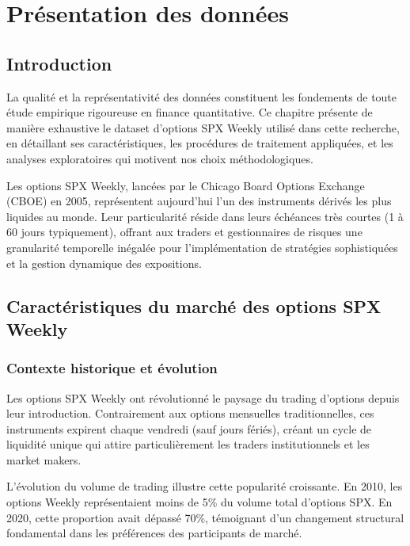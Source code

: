 \chapter{Présentation des données}

\section{Introduction}

La qualité et la représentativité des données constituent les fondements de toute étude empirique rigoureuse en finance quantitative. Ce chapitre présente de manière exhaustive le dataset d'options SPX Weekly utilisé dans cette recherche, en détaillant ses caractéristiques, les procédures de traitement appliquées, et les analyses exploratoires qui motivent nos choix méthodologiques.

Les options SPX Weekly, lancées par le Chicago Board Options Exchange (CBOE) en 2005, représentent aujourd'hui l'un des instruments dérivés les plus liquides au monde. Leur particularité réside dans leurs échéances très courtes (1 à 60 jours typiquement), offrant aux traders et gestionnaires de risques une granularité temporelle inégalée pour l'implémentation de stratégies sophistiquées et la gestion dynamique des expositions.

\section{Caractéristiques du marché des options SPX Weekly}

\subsection{Contexte historique et évolution}

Les options SPX Weekly ont révolutionné le paysage du trading d'options depuis leur introduction. Contrairement aux options mensuelles traditionnelles, ces instruments expirent chaque vendredi (sauf jours fériés), créant un cycle de liquidité unique qui attire particulièrement les traders institutionnels et les market makers.

L'évolution du volume de trading illustre cette popularité croissante. En 2010, les options Weekly représentaient moins de 5\% du volume total d'options SPX. En 2020, cette proportion avait dépassé 70\%, témoignant d'un changement structural fondamental dans les préférences des participants de marché.

